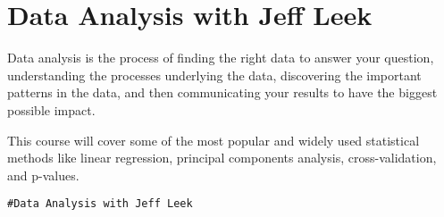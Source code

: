 \documentclass[12pt]{article}
\begin{document}
\section{Data Analysis with Jeff Leek}
Data analysis is the process of finding the right data to answer your question, understanding the processes underlying the data, discovering the important patterns in the data, and then communicating your results to have the biggest possible impact. 

This course will cover some of the most popular and widely used statistical methods like linear regression, principal components analysis, cross-validation, and p-values.
\begin{framed}
\begin{verbatim}
#Data Analysis with Jeff Leek

\end{verbatim}
\end{framed}
\end{document}
